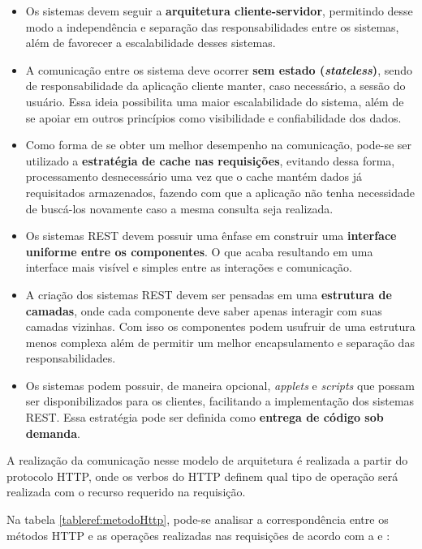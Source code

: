 \begin{itemize}
		\item Os sistemas devem seguir a \textbf{arquitetura cliente-servidor}, permitindo desse modo a independência e separação das responsabilidades entre os sistemas, além de favorecer a escalabilidade desses sistemas.
		
		\item A comunicação entre os sistema deve ocorrer \textbf{sem estado (\textit{stateless})}, sendo de responsabilidade da aplicação cliente manter, caso necessário, a sessão do usuário. Essa ideia possibilita uma maior escalabilidade do sistema, além de se apoiar em outros princípios como visibilidade e confiabilidade dos dados.
		
		\item Como forma de se obter um melhor desempenho na comunicação, pode-se ser utilizado a \textbf{estratégia de cache nas requisições}, evitando dessa forma, processamento desnecessário uma vez que o cache mantém dados já requisitados armazenados, fazendo com que a aplicação não tenha necessidade de buscá-los novamente caso a mesma consulta seja realizada.
		
		\item Os sistemas REST devem possuir uma ênfase em construir uma \textbf{interface uniforme entre os componentes}. O que acaba resultando em uma interface mais visível e simples entre as interações e comunicação.
		
		\item A criação dos sistemas REST devem ser pensadas em uma \textbf{estrutura de camadas}, onde cada componente deve saber apenas interagir com suas camadas vizinhas. Com isso os componentes podem usufruir de uma estrutura menos complexa além de permitir um melhor encapsulamento e separação das responsabilidades.
		
		\item Os sistemas podem possuir, de maneira opcional, \textit{applets} e \textit{scripts} que possam ser disponibilizados para os clientes, facilitando a implementação dos sistemas REST. Essa estratégia pode ser definida como \textbf{entrega de código sob demanda}.
	\end{itemize}

A realização da comunicação nesse modelo de arquitetura é realizada a partir do protocolo HTTP, onde os verbos do HTTP definem qual tipo de operação será realizada com o recurso requerido na requisição.

Na tabela \ref{tableref:metodoHttp}, pode-se analisar a correspondência entre os métodos HTTP e as operações realizadas nas requisições de acordo com a  e :

